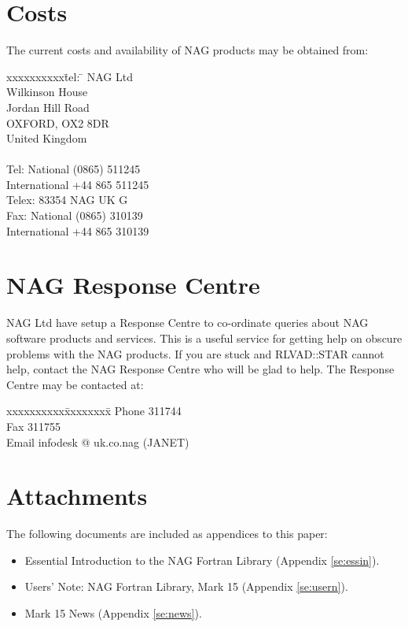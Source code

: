 \section{Costs}

The current costs and availability of NAG products may be obtained from:
\begin{tabbing}
xxxxxxxxxx\=tel: \=\kill
\>NAG Ltd\\
\>Wilkinson House\\
\>Jordan Hill Road\\
\>OXFORD, OX2 8DR\\
\>United Kingdom\\
\\
\>Tel: National (0865) 511245\\
\>\>International +44 865 511245\\
\>Telex: 83354 NAG UK G\\
\>Fax: National (0865) 310139\\
\>\>International +44 865 310139
\end{tabbing}

\section{NAG Response Centre}
\label{se:infodesk}

NAG Ltd have setup a Response Centre to co-ordinate queries about NAG software
products and services. This is a useful service for getting help on obscure
problems with the NAG products. If you are stuck and RLVAD::STAR cannot help, 
contact the NAG Response Centre who will be glad to help. The Response Centre
may be contacted at:

\begin{tabbing}
xxxxxxxxxx\=xxxxxxxx\=\kill
\>Phone   311744 \\
\>Fax     311755 \\
\>Email  \>infodesk @ uk.co.nag   (JANET) \\
\end{tabbing}

\section{Attachments}

The following documents are included as appendices to this paper:
\begin{itemize}
\item Essential Introduction to the NAG Fortran Library (Appendix 
\ref{se:essin}).
\item Users' Note: NAG Fortran Library, Mark 15 (Appendix \ref{se:usern}).
\item Mark 15 News (Appendix \ref{se:news}).
\end{itemize}

